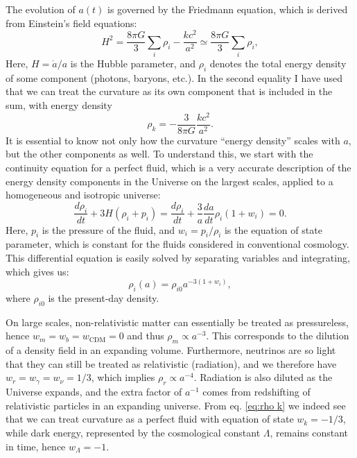 \documentclass{aa}
\numberwithin{equation}{section}
\numberwithin{table}{section}
\numberwithin{figure}{section}
\begin{document}
The evolution of $a(t)$ is governed by the Friedmann equation, which is derived from Einstein's field equations:
\begin{equation}
    H^2 = \frac{8\pi G}{3} \sum_{i}\rho_i - \frac{k c^2}{a^2} \simeq \frac{8\pi G}{3} \sum_{i}\rho_i,
\end{equation}
Here, $H = \dot{a}/a$ is the Hubble parameter, and $\rho_i$ denotes the total energy density of some component (photons, baryons, etc.). In the second equality I have used that we can treat the curvature as its own component that is included in the sum, with energy density
\begin{equation}
  \rho_k = -\frac{3}{8\pi G}\frac{k c^2}{a^2}. \label{eq:rho k}
\end{equation}
It is essential to know not only how the curvature ``energy density'' scales with $a$, but the other components as well. To understand this, we start with the continuity equation for a perfect fluid, which is a very accurate description of the energy density components in the Universe on the largest scales, applied to a homogeneous and isotropic universe:
\begin{equation}
  \frac{d\rho_i}{dt} + 3H (\rho_i+ p_i) = \frac{d\rho_i}{dt} + \frac{3}{a}\frac{da}{dt} \rho_i(1 + w_i) = 0.
\end{equation}
Here, $p_i$ is the pressure of the fluid, and $w_i=p_i/\rho_i$ is the equation of state parameter, which is constant for the fluids considered in conventional cosmology. This differential equation is easily solved by separating variables and integrating, which gives us:
\begin{equation}
  \rho_i(a) = \rho_{i0} a^{-3(1+w_i)},
\end{equation}
where $\rho_{i0}$ is the present-day density.

On large scales, non-relativistic matter can essentially be treated as pressureless, hence $w_m = w_b=w_\text{CDM}=0$ and thus $\rho_m \propto a^{-3}$. This corresponds to the dilution of a density field in an expanding volume. Furthermore, neutrinos are so light that they can still be treated as relativistic (radiation), and we therefore have $w_r=w_\gamma=w_\nu=1/3$, which implies $\rho_r\propto a^{-4}$. Radiation is also diluted as the Universe expands, and the extra factor of $a^{-1}$ comes from redshifting of relativistic particles in an expanding universe. From eq. \eqref{eq:rho k} we indeed see that we can treat curvature as a perfect fluid with equation of state $w_k=-1/3$, while dark energy, represented by the cosmological constant $\Lambda$, remains constant in time, hence $w_\Lambda=-1$. 
\end{document}

